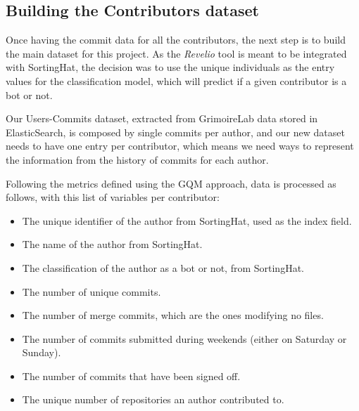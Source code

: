 \documentclass[a4paper, 12pt]{book}
\begin{document}
\subsection{Building the Contributors dataset}
\label{ssec:build-contributors-dataset}

Once having the commit data for all the contributors, the next step is to build the main dataset for this project. As the \emph{Revelio} tool is meant to be integrated with SortingHat, the decision was to use the unique individuals as the entry values for the classification model, which will predict if a given contributor is a bot or not.

Our Users-Commits dataset, extracted from GrimoireLab data stored in ElasticSearch, is composed by single commits per author, and our new dataset needs to have one entry per contributor, which means we need ways to represent the information from the history of commits for each author.

Following the metrics defined using the GQM approach, data is processed as follows, with this list of variables per contributor:

\begin{itemize}
\item The unique identifier of the author from SortingHat, used as the index field.
\item The name of the author from SortingHat.
\item The classification of the author as a bot or not, from SortingHat.
\item The number of unique commits.
\item The number of merge commits, which are the ones modifying no files.
\item The number of commits submitted during weekends (either on Saturday or Sunday).
\item The number of commits that have been signed off.
\item The unique number of repositories an author contributed to.
\end{itemize}
\end{document}

